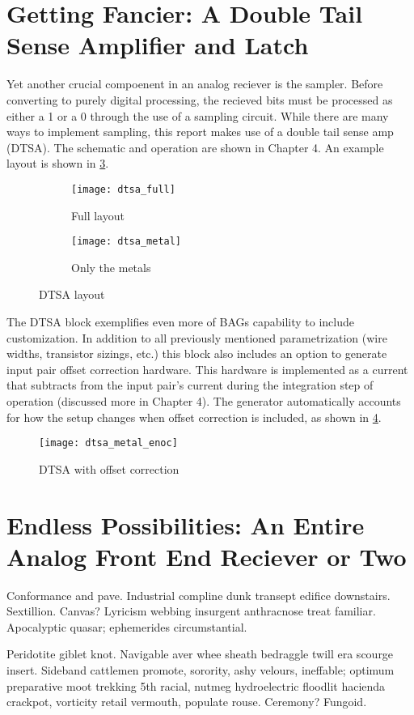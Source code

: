 \section{Getting Fancier: A Double Tail Sense Amplifier and Latch}

Yet another crucial compoenent in an analog reciever is the sampler. Before converting to purely digital processing, the recieved bits must be processed as either a 1 or a 0 through the use of a sampling circuit. While there are many ways to implement sampling, this report makes use of a double tail sense amp (DTSA). The schematic and operation are shown in Chapter 4. An example layout is shown in \ref{fig:dtsa_ex}.
\begin{figure}[h]
\centering
\begin{subfigure}{.4\linewidth}
  \centering
  \texttt{[image: dtsa\_full]}
  \caption{Full layout}
  \label{fig:sfig1}
\end{subfigure}
\begin{subfigure}{.4\linewidth}
  \centering
\texttt{[image: dtsa\_metal]}
  \caption{Only the metals}
  \label{fig:sfig2}
\end{subfigure}
\caption{DTSA layout}
\label{fig:dtsa_ex}
\end{figure}
The DTSA block exemplifies even more of BAGs capability to include customization. In addition to all previously mentioned parametrization (wire widths, transistor sizings, etc.) this block also includes an option to generate input pair offset correction hardware. This hardware is implemented as a current that subtracts from the input pair's current during the integration step of operation (discussed more in  Chapter 4). The generator automatically accounts for how the setup changes when offset correction is included, as shown in \ref{fig:dtsa_enoc}.
\begin{figure}[h]
\centering
\texttt{[image: dtsa\_metal\_enoc]}
\caption{DTSA with offset correction}
\label{fig:dtsa_enoc}
\end{figure}


\section{Endless Possibilities: An Entire Analog Front End Reciever or Two}

Conformance and pave.  Industrial compline dunk transept edifice
downstairs.  Sextillion.  Canvas?  Lyricism webbing insurgent
anthracnose treat familiar.  Apocalyptic quasar; ephemerides
circumstantial.

Peridotite giblet knot.  Navigable aver whee sheath bedraggle twill
era scourge insert.  Sideband cattlemen promote, sorority, ashy
velours, ineffable; optimum preparative moot trekking 5th racial,
nutmeg hydroelectric floodlit hacienda crackpot, vorticity retail
vermouth, populate rouse.  Ceremony?  Fungoid.